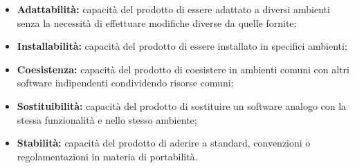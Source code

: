 \begin{itemize}
\begin{itemize}
		\item \textbf{Adattabilità:} capacità del prodotto di essere adattato a diversi ambienti senza la necessità di effettuare modifiche diverse da quelle fornite;
		\item \textbf{Installabilità:} capacità del prodotto di essere installato in specifici ambienti;
		\item \textbf{Coesistenza:} capacità del prodotto di coesistere in ambienti comuni con altri software indipendenti condividendo risorse comuni;
		\item \textbf{Sostituibilità:} capacità del prodotto di sostituire un software analogo con la stessa funzionalità e nello stesso ambiente;
		\item \textbf{Stabilità:} capacità del prodotto di aderire a standard, convenzioni o regolamentazioni in materia di portabilità.
	\end{itemize}
\end{itemize}
\pagebreak
